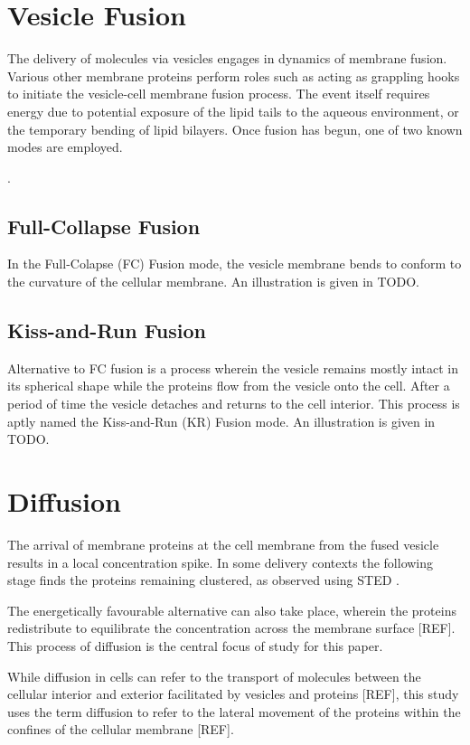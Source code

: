 \documentclass{report}
\begin{document}
\section{Vesicle Fusion}
The delivery of molecules via vesicles engages in dynamics of membrane fusion. Various other membrane proteins perform roles such as acting as grappling hooks to initiate the vesicle-cell membrane fusion process. The event itself requires energy due to potential exposure of the lipid tails to the aqueous environment, or the temporary bending of lipid bilayers. Once fusion has begun, one of two known modes are employed.

\cite{sochacki2012imaging}.

\subsection{Full-Collapse Fusion}
In the Full-Colapse (FC) Fusion mode, the vesicle membrane bends to conform to the curvature of the cellular membrane. An illustration is given in TODO.

\subsection{Kiss-and-Run Fusion}
Alternative to FC fusion is a process wherein the vesicle remains mostly intact in its spherical shape while the proteins flow from the vesicle onto the cell. After a period of time the vesicle detaches and returns to the cell interior. This process is aptly named the Kiss-and-Run (KR) Fusion mode. An illustration is given in TODO.

\cite{alabi2013perspectives}

\section{Diffusion}
The arrival of membrane proteins at the cell membrane from the fused vesicle results in a local concentration spike. In some delivery contexts the following stage finds the proteins remaining clustered, as observed using STED \cite{willig2006sted}.

The energetically favourable alternative can also take place, wherein the proteins redistribute to equilibrate the concentration across the membrane surface [REF]. This process of diffusion is the central focus of study for this paper.

While diffusion in cells can refer to the transport of molecules between the cellular interior and exterior facilitated by vesicles and proteins [REF], this study uses the term diffusion to refer to the lateral movement of the proteins within the confines of the cellular membrane [REF].
\end{document}
